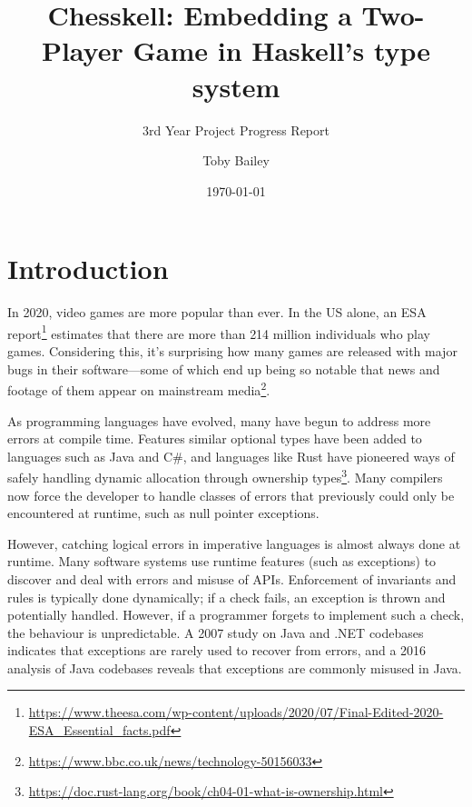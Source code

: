 \documentclass[12pt, a4paper, bibliography=totocnumbered]{scrartcl}
\title{Chesskell: Embedding a Two-Player Game in Haskell's type system}
\subtitle{3rd Year Project Progress Report}
\author{Toby Bailey}
\date{\today}
\begin{document}
\begin{titlepage}
    \maketitle
    \tableofcontents
\end{titlepage}

\section{Introduction}

In 2020, video games are more popular than ever. In the US alone, an ESA report\footnote{\url{https://www.theesa.com/wp-content/uploads/2020/07/Final-Edited-2020-ESA_Essential_facts.pdf}} estimates that there are more than 214 million individuals who play games. Considering this, it's surprising how many games are released with major bugs in their software---some of which end up being so notable that news and footage of them appear on mainstream media\footnote{\url{https://www.bbc.co.uk/news/technology-50156033}}.

As programming languages have evolved, many have begun to address more errors at compile time. Features similar optional types have been added to languages such as Java and C\#, and languages like Rust have pioneered ways of safely handling dynamic allocation through ownership types\footnote{\url{https://doc.rust-lang.org/book/ch04-01-what-is-ownership.html}}. Many compilers now force the developer to handle classes of errors that previously could only be encountered at runtime, such as null pointer exceptions.


However, catching logical errors in imperative languages is almost always done at runtime. Many software systems use runtime features (such as exceptions) to discover and deal with errors and misuse of APIs. Enforcement of invariants and rules is typically done dynamically; if a check fails, an exception is thrown and potentially handled. However, if a programmer forgets to implement such a check, the behaviour is unpredictable. A 2007 study \cite{exceptionsusedpoorly} on Java and .NET codebases indicates that exceptions are rarely used to recover from errors, and a 2016 analysis of Java codebases \cite{badjavaexceptions} reveals that exceptions are commonly misused in Java.
\end{document}
